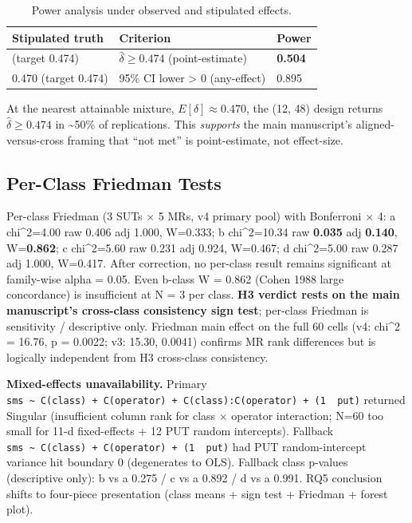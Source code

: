 \documentclass[review,12pt,authoryear]{elsarticle}
\begin{document}
{\def\LTcaptype{table} %
\begin{longtable}[]{@{}lll@{}}
\caption{Power analysis under observed and stipulated effects.}\label{tab:p2-24}\\
\toprule\noalign{}
Stipulated truth & Criterion & Power \\
\midrule\noalign{}
\endfirsthead
\endhead
\bottomrule\noalign{}
\endlastfoot
0.470 (target 0.474) & $\hat{\delta} \geq 0.474$ (point-estimate) & \textbf{0.504} \\
0.470 (target 0.474) & 95\% CI lower \textgreater{} 0 (any-effect) & 0.895 \\
\end{longtable}
}

At the nearest attainable mixture, \(E[\delta]\approx0.470\), the
(12, 48) design returns $\hat{\delta} \geq
0.474$ in \textasciitilde50\% of replications. This
\emph{supports} the main manuscript's aligned-versus-cross framing that ``not met'' is point-estimate, not
effect-size.

\subsection{Per-Class Friedman Tests}\label{d.4-friedman-per-class-discussion-of-small-n-concordance}

Per-class Friedman (3 SUTs $\times$ 5 MRs, v4 primary pool) with Bonferroni
$\times$ 4: a chi\^{}2=4.00
raw 0.406 adj 1.000, W=0.333; b chi\^{}2=10.34 raw \textbf{0.035} adj
\textbf{0.140}, W=\textbf{0.862}; c chi\^{}2=5.60 raw 0.231 adj 0.924,
W=0.467; d chi\^{}2=5.00 raw 0.287 adj 1.000, W=0.417. After correction,
no per-class result remains significant at family-wise alpha = 0.05.
Even b-class W = 0.862 (Cohen 1988 large concordance) is insufficient at
N = 3 per class. \textbf{H3 verdict rests on the main manuscript's cross-class consistency sign test}; per-class
Friedman is sensitivity / descriptive only. Friedman main effect on the full
60 cells (v4: chi\^{}2 = 16.76, p = 0.0022; v3: 15.30, 0.0041) confirms
MR rank differences but
is logically independent from H3 cross-class consistency.

\textbf{Mixed-effects unavailability.} Primary
\texttt{sms\ \textasciitilde{}\ C(class)\ +\ C(operator)\ +\ C(class):C(operator)\ +\ (1\ \textbar{}\ put)}
returned Singular (insufficient column rank for class $\times$ operator
interaction; N=60 too small for 11-d fixed-effects + 12 PUT random
intercepts). Fallback
\texttt{sms\ \textasciitilde{}\ C(class)\ +\ C(operator)\ +\ (1\ \textbar{}\ put)}
had PUT random-intercept variance hit boundary 0 (degenerates to OLS).
Fallback class p-values (descriptive only): b vs a 0.275 / c vs a 0.892
/ d vs a 0.991. RQ5 conclusion shifts to four-piece presentation (class
means + sign test + Friedman + forest plot).
\end{document}
